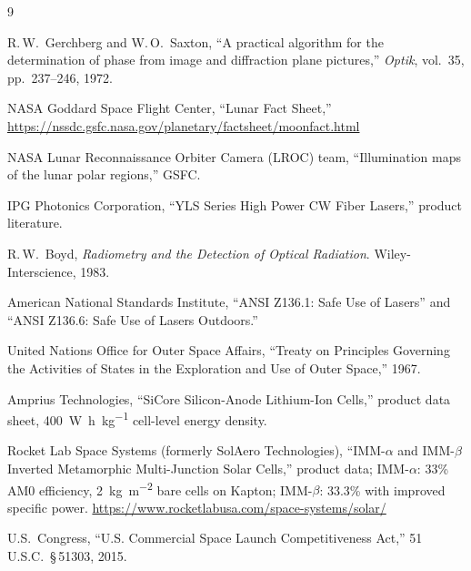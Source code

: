 \documentclass[12pt,letterpaper]{article}
\begin{document}
\begin{thebibliography}{9}

  R.\,W.\ Gerchberg and W.\,O.\ Saxton,
  ``A practical algorithm for the determination of phase from image and
  diffraction plane pictures,''
  \textit{Optik}, vol.~35, pp.~237--246, 1972.

  NASA Goddard Space Flight Center,
  ``Lunar Fact Sheet,''
  \url{https://nssdc.gsfc.nasa.gov/planetary/factsheet/moonfact.html}

  NASA Lunar Reconnaissance Orbiter Camera (LROC) team,
  ``Illumination maps of the lunar polar regions,'' GSFC.

  IPG Photonics Corporation,
  ``YLS Series High Power CW Fiber Lasers,'' product literature.

  R.\,W.\ Boyd,
  \textit{Radiometry and the Detection of Optical Radiation}.
  Wiley-Interscience, 1983.

  American National Standards Institute,
  ``ANSI Z136.1: Safe Use of Lasers'' and
  ``ANSI Z136.6: Safe Use of Lasers Outdoors.''

  United Nations Office for Outer Space Affairs,
  ``Treaty on Principles Governing the Activities of States in the Exploration
  and Use of Outer Space,'' 1967.

  Amprius Technologies,
  ``SiCore Silicon-Anode Lithium-Ion Cells,'' product data sheet,
  \SI{400}{\watt\hour\per\kilo\gram} cell-level energy density.

  Rocket Lab Space Systems (formerly SolAero Technologies),
  ``IMM-$\alpha$ and IMM-$\beta$ Inverted Metamorphic Multi-Junction Solar
  Cells,'' product data; IMM-$\alpha$: 33\% AM0 efficiency,
  \SI{2}{\kilo\gram\per\meter\squared} bare cells on Kapton; IMM-$\beta$:
  33.3\% with improved specific power.
  \url{https://www.rocketlabusa.com/space-systems/solar/}

  U.S.\ Congress,
  ``U.S. Commercial Space Launch Competitiveness Act,''
  51\,U.S.C.\ \S\,51303, 2015.

\end{thebibliography}
\end{document}
